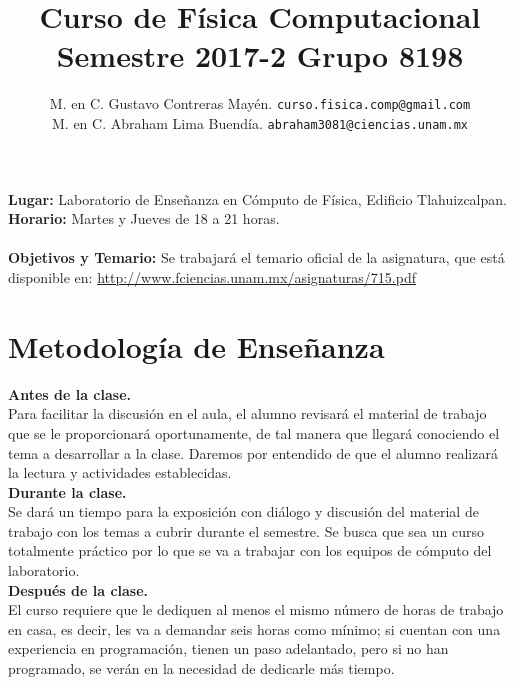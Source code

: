 \documentclass[12pt]{article}
\author{M. en C. Gustavo Contreras Mayén. \texttt{curso.fisica.comp@gmail.com}\\
M. en C. Abraham Lima Buendía. \texttt{abraham3081@ciencias.unam.mx}}
\title{Curso de Física Computacional\\{\large Semestre 2017-2 Grupo 8198}}
\date{ }
\begin{document}
\renewcommand\labelenumii{\theenumi.{\arabic{enumii}}}
\maketitle
\fontsize{12}{12}\selectfont
\textbf{Lugar: }Laboratorio de Enseñanza en Cómputo de Física, Edificio Tlahuizcalpan.
\\
\textbf{Horario: } Martes y Jueves de 18 a 21 horas.
\\
\\

\textbf{Objetivos y Temario:} Se trabajará el temario oficial de la asignatura, que está disponible en: \href{http://www.fciencias.unam.mx/asignaturas/715.pdf}{http://www.fciencias.unam.mx/asignaturas/715.pdf}
\section{Metodología de Enseñanza}
\textbf{Antes de la clase.}
\\
Para facilitar la discusión en el aula, el alumno revisará el material de trabajo que se le proporcionará oportunamente, de tal manera que llegará conociendo el tema a desarrollar a la clase. Daremos por entendido de que el alumno realizará la lectura y actividades establecidas.
\\
\textbf{Durante la clase.}
\\
Se dará un tiempo para la exposición con diálogo y discusión del material de trabajo con los temas a cubrir durante el semestre. Se busca que sea un curso totalmente práctico por lo que se va a trabajar con los equipos de cómputo del laboratorio.
\\
\textbf{Después de la clase.}
\\
El curso requiere que le dediquen al menos el mismo número de horas de trabajo en casa, es decir, les va a demandar seis horas como mínimo; si cuentan con una experiencia en programación, tienen un paso adelantado, pero si no han programado, se verán en la necesidad de dedicarle más tiempo.
\end{document}
